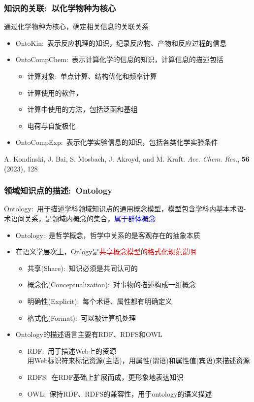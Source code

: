 \frame
{
	\frametitle{知识的关联:~以化学物种为核心}
	通过化学物种为核心，确定相关信息的关联关系
	\begin{itemize}
		\item \textrm{OntoKin}:~表示反应机理的知识，纪录反应物、产物和反应过程的信息
		\item \textrm{OntoCompChem}:~表示计算化学的信息的知识，计算信息的描述包括
			\begin{itemize}
				\item 计算对象:~单点计算、结构优化和频率计算
				\item 计算使用的软件，{\fontsize{7.2pt}{5.2pt}}
				\item 计算中使用的方法，包括泛函和基组{\fontsize{7.2pt}{5.2pt}}
				\item 电荷与自旋极化
			\end{itemize}
		\item \textrm{OntoCompExp}:~表示化学实验信息的知识，包括各类化学实验条件
	\end{itemize}
\begin{thebibliography}{99}
{\tiny
{}\textrm{A. Kondinski, J. Bai, S. Mosbach, J. Akroyd, and M. Kraft. \textit{Acc. Chem. Res.}, \textbf{56} (2023), 128}
}
\end{thebibliography}
}

\frame
{
	\frametitle{领域知识点的描述:~\textrm{Ontology}}
	\textrm{Ontology}:~用于描述学科领域知识点的通用概念模型，模型包含学科内基本术语-术语间关系，是领域内概念的集合，\textcolor{blue}{属于群体概念}
	\begin{itemize}
		\item \textrm{Ontology}:~是哲学概念，哲学中关系的是客观存在的抽象本质
		\item 在语义学层次上，\textrm{Onlogy}是\textcolor{red}{共享概念模型的格式化规范说明}
	\begin{itemize}
		\item 共享\textrm{(Share)}:~知识必须是共同认可的
		\item 概念化\textrm{(Conceptualization)}:~对事物的描述构成一组概念
		\item 明确性\textrm{(Explicit)}:~每个术语、属性都有明确定义
		\item 格式化\textrm{(Format)}:~可以被计算机处理
	\end{itemize}
\item \textrm{Ontology}的描述语言主要有\textrm{RDF}、\textrm{RDFS}和\textrm{OWL}
	\begin{itemize}
		\item \textrm{RDF}:~用于描述\textrm{Web}上的资源\\
			用\textrm{Web}标识符来标记资源(主语)，用属性(谓语)和属性值(宾语)来描述资源
		\item \textrm{RDFS}:~在\textrm{RDF}基础上扩展而成，更形象地表达知识
		\item \textrm{OWL}:~保持\textrm{RDF}、\textrm{RDFS}的兼容性，用于\textrm{ontology}的语义描述
	\end{itemize}
	\end{itemize}
}


